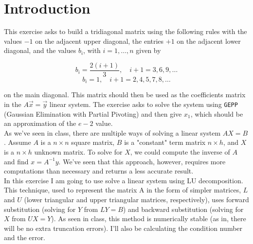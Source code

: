 \documentclass{article}
\newcommand{\code}{\texttt}
\begin{document}

\section{Introduction}\label{sec:intro}
This exercise asks to build a tridiagonal matrix using the following rules with the values $-1$ on the adjacent upper diagonal, the entries $+1$ on the adjacent lower diagonal, and the values $b_{i}$, with $i = 1, \ldots, n$ given by

$$b_i =\frac{2(i+1)}{3},\quad i + 1= 3, 6, 9,\ldots$$
$$b_i =1,\quad i + 1 = 2, 4, 5, 7, 8, \ldots$$

on the main diagonal. This matrix should then be used as the coefficients matrix in the $A\vec{x}=\vec{y}$ linear system. The exercise asks to solve the system using \code{GEPP} (Gaussian Elimination with Partial Pivoting) and then give $x_1$, which should be an approximation of the $e-2$ value.\\

As we've seen in class, there are multiple ways of solving a linear system $AX=B$. Assume $A$ is a $n\times n$ square matrix, $B$ is a "constant" term matrix $n\times h$, and $X$ is a $n\times h$ unknown matrix. To solve for $X$, we could compute the inverse of $A$ and find $x=A^{-1}y$. We've seen that this approach, however, requires more computations than necessary and returns a less accurate result.\\

In this exercise I am going to use solve a linear system using LU decomposition. This technique, used to represent the matrix A in the form of simpler matrices, $L$ and $U$ (lower triangular and upper triangular matrices, respectively), uses forward substitution (solving for $Y$ from $LY=B$) and backward substitution (solving for $X$ from $UX = Y$). As seen in class, this method is numerically stable (as in, there will be no extra truncation errors). I'll also be calculating the condition number and the error.
\end{document}

